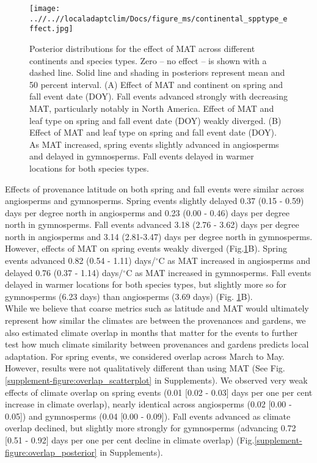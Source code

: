 \documentclass{article}
\begin{document}
\begin{figure}[!h] 
    \centering
 \texttt{[image: ..//..//localadaptclim/Docs/figure\_ms/continental\_spptype\_effect.jpg]}
    \caption{Posterior distributions for the effect of MAT across different continents and species types. Zero -- no effect -- is shown with a dashed line. Solid line and shading in posteriors represent mean and 50 percent interval. (A) Effect of MAT and continent on spring and fall event date (DOY). Fall events advanced strongly with decreasing MAT, particularly notably in North America. Effect of MAT and leaf type on spring and fall event date (DOY) weakly diverged. (B) Effect of MAT and leaf type on spring and fall event date (DOY). As MAT increased, spring events slightly advanced in angiosperms and delayed in gymnosperms. Fall events delayed in warmer locations for both species types.}
    \label{figure:continental_spptype_effect}
\end{figure}

Effects of provenance latitude on both spring and fall events were similar across angiosperms and gymnosperms.
Spring events slightly delayed 0.37 (0.15 - 0.59) days per degree north in angiosperms and 0.23 (0.00 - 0.46) days per degree north in gymnosperms. Fall events advanced 3.18 (2.76 - 3.62) days per degree north in angiosperms and 3.14 (2.81-3.47) days per degree north in gymnosperms.
However, effects of MAT on spring events weakly diverged (Fig.\ref{figure:continental_spptype_effect}B). Spring events advanced 0.82 (0.54 - 1.11) days/$^{\circ}$C as MAT increased in angiosperms and delayed 0.76 (0.37 - 1.14) days/$^{\circ}$C as MAT increased in gymnosperms. Fall events delayed in warmer locations for both species types, but slightly more so for gymnosperms (6.23 days) than angiosperms (3.69 days) (Fig. \ref{figure:continental_spptype_effect}B).\\

While we believe that coarse metrics such as latitude and MAT would ultimately represent how similar the climates are between the provenances and gardens, we also estimated climate overlap in months that matter for the events to further test how much climate similarity between provenances and gardens predicts local adaptation. For spring events, we considered overlap across March to May. However, results were not qualitatively different than using MAT (See Fig. \ref{supplement-figure:overlap_scatterplot} in Supplements). We observed very weak effects of climate overlap on spring events (0.01 [0.02 - 0.03] days per one per cent increase in climate overlap), nearly identical across angiosperms (0.02 [0.00 - 0.05]) and gymnosperms (0.04 [0.00 - 0.09]). Fall events advanced as climate overlap declined, but slightly more strongly for gymnosperms (advancing 0.72 [0.51 - 0.92] days per one per cent decline in climate overlap) (Fig.\ref{supplement-figure:overlap_posterior} in Supplements).
\end{document}

